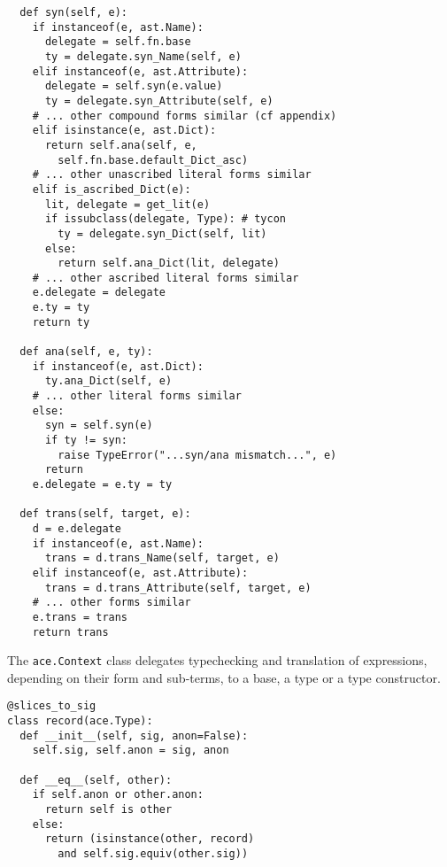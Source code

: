 \documentclass[10pt,preprint]{sigplanconf}
\begin{document}
{\begin{codelisting}
\begin{lstlisting}
  def syn(self, e):
    if instanceof(e, ast.Name):
      delegate = self.fn.base
      ty = delegate.syn_Name(self, e)
    elif instanceof(e, ast.Attribute):
      delegate = self.syn(e.value)
      ty = delegate.syn_Attribute(self, e)
    # ... other compound forms similar (cf appendix)
    elif isinstance(e, ast.Dict):
      return self.ana(self, e, 
        self.fn.base.default_Dict_asc)
    # ... other unascribed literal forms similar
    elif is_ascribed_Dict(e):
      lit, delegate = get_lit(e)
      if issubclass(delegate, Type): # tycon
        ty = delegate.syn_Dict(self, lit)
      else:
        return self.ana_Dict(lit, delegate)
    # ... other ascribed literal forms similar
    e.delegate = delegate
    e.ty = ty
    return ty
    
  def ana(self, e, ty):
    if instanceof(e, ast.Dict):
      ty.ana_Dict(self, e)
    # ... other literal forms similar
    else:
      syn = self.syn(e)
      if ty != syn:
        raise TypeError("...syn/ana mismatch...", e)
      return
    e.delegate = e.ty = ty
    
  def trans(self, target, e):
    d = e.delegate
    if instanceof(e, ast.Name): 
      trans = d.trans_Name(self, target, e)
    elif instanceof(e, ast.Attribute):
      trans = d.trans_Attribute(self, target, e)
	# ... other forms similar
	e.trans = trans
	return trans
\end{lstlisting}
\caption{The \texttt{ace.Context} class delegates typechecking and translation of expressions, depending on their form and sub-terms, to a base, a type or a type constructor.}
\label{context}
\end{codelisting}


\begin{codelisting}
\begin{lstlisting}
@slices_to_sig
class record(ace.Type):
  def __init__(self, sig, anon=False):
    self.sig, self.anon = sig, anon
    
  def __eq__(self, other): 
    if self.anon or other.anon: 
      return self is other
    else: 
      return (isinstance(other, record) 
        and self.sig.equiv(other.sig))


\end{lstlisting}
\end{codelisting}}
\end{document}
